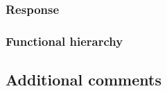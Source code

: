 \documentclass{article}
\begin{document}
\subsubsection{Response}

\subsubsection{Functional hierarchy}


\subsection{Additional comments}


\end{document}
